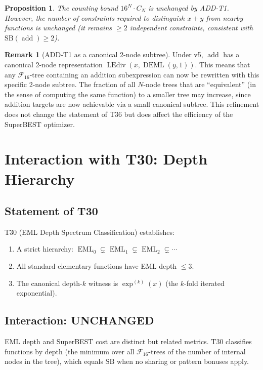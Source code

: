 \documentclass[12pt,a4paper]{article}
\newtheorem{proposition}[theorem]{Proposition}
\theoremstyle{definition}
\newtheorem{remark}[theorem]{Remark}
\newcommand{\EML}{\operatorname{EML}}
\newcommand{\DEML}{\operatorname{DEML}}
\newcommand{\LEdiv}{\operatorname{LEdiv}}
\newcommand{\addop}{\operatorname{add}}
\newcommand{\SB}{\mathrm{SB}}
\newcommand{\F}{\mathcal{F}_{16}}
\newcommand{\Unchanged}{\textcolor{unchanged}{\textbf{UNCHANGED}}}
\begin{document}
\begin{proposition}
The counting bound $16^N\cdot C_N$ is unchanged by ADD-T1.
However, the number of constraints required to distinguish $x+y$ from
nearby functions is unchanged (it remains $\geq 2$ independent constraints,
consistent with $\SB(\addop)\geq 2$).
\end{proposition}

\begin{remark}[ADD-T1 as a canonical 2-node subtree]
Under v5, $\addop$ has a canonical 2-node representation
$\LEdiv(x,\DEML(y,1))$.  This means that any $\F$-tree containing an
addition subexpression can now be rewritten with this specific 2-node subtree.
The fraction of all $N$-node trees that are ``equivalent'' (in the sense of
computing the same function) to a smaller tree may increase,
since addition targets are now achievable via a small canonical subtree.
This refinement does not change the statement of T36 but does affect the
efficiency of the SuperBEST optimizer.
\end{remark}

\section{Interaction with T30: Depth Hierarchy}
\label{sec:T30}

\subsection{Statement of T30}

T30 (EML Depth Spectrum Classification) establishes:
\begin{enumerate}
\item A strict hierarchy: $\EML_0 \subsetneq \EML_1 \subsetneq \EML_2 \subsetneq \cdots$
\item All standard elementary functions have EML depth $\leq 3$.
\item The canonical depth-$k$ witness is $\exp^{(k)}(x)$ (the $k$-fold iterated exponential).
\end{enumerate}

\subsection{Interaction: \Unchanged}

EML depth and SuperBEST cost are distinct but related metrics.  T30 classifies
functions by depth (the minimum over all $\F$-trees of the number of internal
nodes in the tree), which equals $\SB$ when no sharing or pattern bonuses apply.
\end{document}
